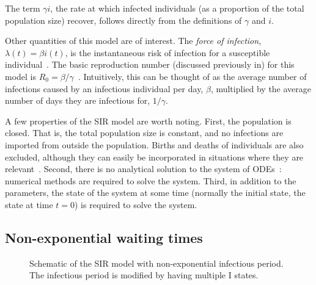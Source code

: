 \documentclass[thesis.tex]{subfiles}
\begin{document}
The term $\gamma i$, the rate at which infected individuals (as a proportion of the total population size) recover, follows directly from the definitions of $\gamma$ and $i$.

Other quantities of this model are of interest.
The \emph{force of infection}, $\lambda(t) = \beta i(t)$, is the instantaneous risk of infection for a susceptible individual~\autocite[17]{keelingModeling}.
The basic reproduction number (discussed previously in) for this model is $R_0 = \beta / \gamma$~\autocite[20]{keelingModeling}.
Intuitively, this can be thought of as the average number of infections caused by an infectious individual per day, $\beta$, multiplied by the average number of days they are infectious for, $1/\gamma$.

A few properties of the SIR model are worth noting.
First, the population is closed.
That is, the total population size is constant, and no infections are imported from outside the population.
Births and deaths of individuals are also excluded, although they can easily be incorporated in situations where they are relevant~\autocites[26]{keelingModeling}[214]{kretzschmarMathematical}.
Second, there is no analytical solution to the system of ODEs~\autocite[25]{keelingModeling}: numerical methods are required to solve the system.
Third, in addition to the parameters, the state of the system at some time (normally the initial state, the state at time $t=0$) is required to solve the system.


\subsection{Non-exponential waiting times} \label{SEIR:sec:non-exponential}
\begin{figure}[h]
  \caption[The SIR model with non-exponential infectious period]{Schematic of the SIR model with non-exponential infectious period. The infectious period is modified by having multiple I states.}
  \label{SEIR:fig:SIR-gamma}
\end{figure}
\end{document}
